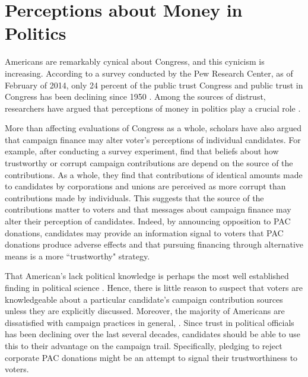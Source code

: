 \documentclass[12pt]{article}
\begin{document}
\section{Perceptions about Money in Politics}

 Americans are remarkably cynical about Congress, and this cynicism is increasing. According to a survey conducted by the Pew Research Center, as of February of 2014, only 24 percent of the public trust Congress \citep{pewresearchcenter2014} and public trust in Congress has been declining since 1950 \citep{dalton2005}. Among the sources of distrust, researchers have argued that perceptions of money in politics play a crucial role \citep{lubenow2001}. 
 
 More than affecting evaluations of Congress as a whole, scholars have also argued that campaign finance may alter voter's perceptions of individual candidates. For example, after conducting a survey experiment, \citet{bowler2016} find that beliefs about how trustworthy or corrupt campaign contributions are depend on the source of the contributions. As a whole, they find that contributions of identical amounts made to candidates by corporations and unions are perceived as more corrupt than contributions made by individuals. This suggests that the source of the contributions matter to voters and that messages about campaign finance may alter their perception of candidates. Indeed, by announcing opposition to PAC donations, candidates may provide an information signal to voters that PAC donations produce adverse effects and that pursuing financing through alternative means is a more ``trustworthy" strategy.
 
 That American's lack political knowledge is perhaps the most well established finding in political science \citep{page1992, carpini1997}. Hence, there is little reason to suspect that voters are knowledgeable about a particular candidate's campaign contribution sources unless they are explicitly discussed. Moreover, the majority of Americans are dissatisfied with campaign practices in general, \citep{mayer2001, persily2004}. Since trust in political officials has been declining over the last several decades, candidates should be able to use this to their advantage on the campaign trail. Specifically, pledging to reject corporate PAC donations might be an attempt to signal their trustworthiness to voters. 
 
\end{document}
